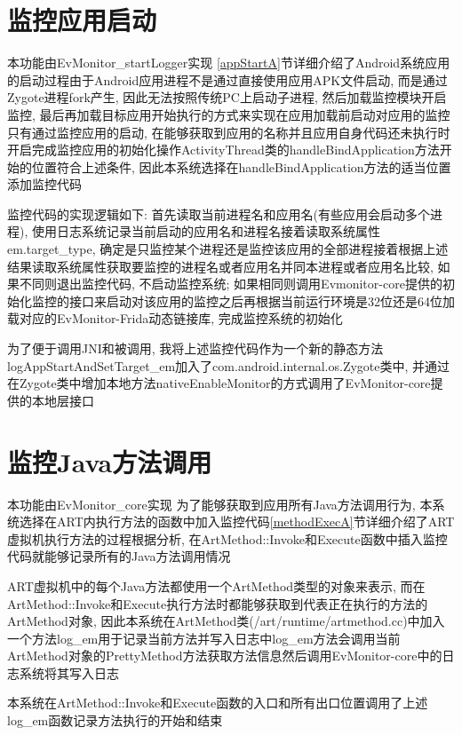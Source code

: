 \section{监控应用启动}
本功能由EvMonitor\_startLogger实现\juhao 
\ref{appStartA}节详细介绍了Android系统应用的启动过程\juhao 由于Android应用进程不是通过直接使用应用APK文件启动, 而是通过Zygote进程fork产生, 因此无法按照传统PC上启动子进程, 然后加载监控模块开启监控, 最后再加载目标应用开始执行的方式来实现在应用加载前启动对应用的监控\juhao 只有通过监控应用的启动, 在能够获取到应用的名称并且应用自身代码还未执行时开启完成监控应用的初始化操作\juhao ActivityThread类的handleBindApplication方法开始的位置符合上述条件, 因此本系统选择在handleBindApplication方法的适当位置添加监控代码\juhao 

监控代码的实现逻辑如下:
首先读取当前进程名和应用名(有些应用会启动多个进程), 使用日志系统记录当前启动的应用名和进程名\juhao 接着读取系统属性em.target\_type, 确定是只监控某个进程还是监控该应用的全部进程\juhao 接着根据上述结果读取系统属性获取要监控的进程名或者应用名并同本进程或者应用名比较, 如果不同则退出监控代码, 不启动监控系统; 如果相同则调用Evmonitor-core提供的初始化监控的接口来启动对该应用的监控\juhao 之后再根据当前运行环境是32位还是64位加载对应的EvMonitor-Frida动态链接库, 完成监控系统的初始化\juhao 

为了便于调用JNI和被调用, 我将上述监控代码作为一个新的静态方法logAppStartAndSetTarget\_em加入了com.android.internal.os.Zygote类中, 并通过在Zygote类中增加本地方法nativeEnableMonitor的方式调用了EvMonitor-core提供的本地层接口\juhao 

\section{监控Java方法调用}
本功能由EvMonitor\_core实现\juhao 
为了能够获取到应用所有Java方法调用行为, 本系统选择在ART内执行方法的函数中加入监控代码\juhao  \ref{methodExecA}节详细介绍了ART虚拟机执行方法的过程\juhao 根据分析, 在ArtMethod::Invoke和Execute函数中插入监控代码就能够记录所有的Java方法调用情况\juhao  

ART虚拟机中的每个Java方法都使用一个ArtMethod类型的对象来表示, 而在ArtMethod::Invoke和Execute执行方法时都能够获取到代表正在执行的方法的ArtMethod对象, 因此本系统在ArtMethod类(/art/runtime/artmethod.cc)中加入一个方法log\_em用于记录当前方法并写入日志中\juhao log\_em方法会调用当前ArtMethod对象的PrettyMethod方法获取方法信息然后调用EvMonitor-core中的日志系统将其写入日志\juhao 

本系统在ArtMethod::Invoke和Execute函数的入口和所有出口位置调用了上述log\_em函数记录方法执行的开始和结束\juhao 

